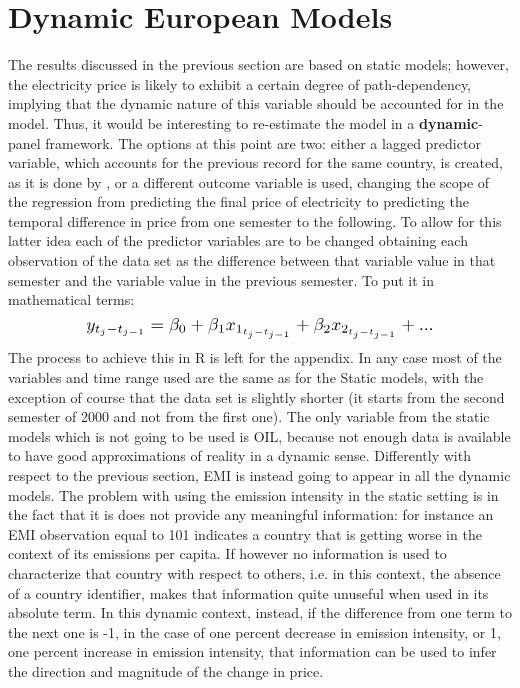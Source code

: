 \documentclass{book}
\begin{document}
\section{Dynamic European Models}

The results discussed in the previous section are based on static models; however, the electricity price is likely to exhibit a certain degree of path-dependency, implying that the dynamic nature of this variable should be accounted for in the model. Thus, it would be interesting to re-estimate the model in a \textbf{dynamic}-panel framework. The options at this point are two: either a lagged predictor variable, which accounts for the previous record for the same country, is created, as it is done by \cite{hyland2016restructuring}, or a different outcome variable is used, changing the scope of the regression from predicting the final price of electricity to predicting the temporal difference in price from one semester to the following. To allow for this latter idea each of the predictor variables are to be changed obtaining each observation of the data set as the difference between that variable value in that semester and the variable value in the previous semester. To put it in mathematical terms: $$ \scalebox{1.25}{$y_{t_j-t_{j-1}} = \beta_0 + \beta_1 x_{1_{t_j - t_{j-1}}} + \beta_2 x_{2_{t_j - t_{j-1}}} + ...$}$$ The process to achieve this in R is left for the appendix. In any case most of the variables and time range used are the same as for the Static models, with the exception of course that the data set is slightly shorter (it starts from the second semester of 2000 and not from the first one). The only variable from the static models which is not going to be used is OIL, because not enough data is available to have good approximations of reality in a dynamic sense. Differently with respect to the previous section, EMI is instead going to appear in all the dynamic models. The problem with using the emission intensity in the static setting is in the fact that it is does not provide any meaningful information: for instance an EMI observation equal to 101 indicates a country that is getting worse in the context of its emissions per capita. If however no information is used to characterize that country with respect to others, i.e. in this context, the absence of a country identifier, makes that information quite unuseful when used in its absolute term. In this dynamic context, instead, if the difference from one term to the next one is -1, in the case of one percent decrease in emission intensity, or 1, one percent increase in emission intensity, that information can be used to infer the direction and magnitude of the change in price.\\
\end{document}
